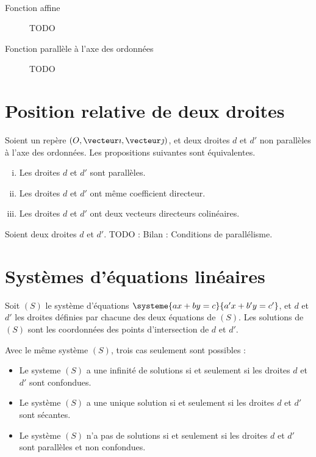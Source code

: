 \begin{methode}~
  \begin{description}
    \item[Fonction affine] TODO
    \item[Fonction parallèle à l'axe des ordonnées] TODO
  \end{description}
\end{methode}

\section{Position relative de deux droites}

\begin{propriete}
  Soient un repère $(O, \vecteur\imath, \vecteur\jmath)$, et deux droites $d$
  et $d'$ non parallèles à l'axe des ordonnées. Les propositions suivantes sont
  équivalentes.
  \begin{enumerate}[(i)]
    \item Les droites $d$ et $d'$ sont parallèles.
    \item Les droites $d$ et $d'$ ont même coefficient directeur.
    \item Les droites $d$ et $d'$ ont deux vecteurs directeurs colinéaires.
  \end{enumerate}
\end{propriete}

\begin{propriete}
  Soient deux droites $d$ et $d'$.
  TODO : Bilan : Conditions de parallélisme.
\end{propriete}

\section{Systèmes d'équations linéaires}

\begin{propriete}
  Soit $(S)$ le système d'équations $\systeme{ax+by=c}{a'x+b'y=c'}$, et $d$ et $d'$ les droites définies par chacune des deux équations de $(S)$. Les solutions de $(S)$ sont les coordonnées des points d'intersection de $d$ et $d'$.
\end{propriete}

\begin{corollaire}Avec le même système $(S)$, trois cas seulement sont possibles :
  \begin{itemize}
    \item Le systeme $(S)$ a une infinité de solutions si et seulement si les droites $d$ et $d'$ sont confondues.
    \item Le système $(S)$ a une unique solution si et seulement si les droites $d$ et $d'$ sont sécantes.
    \item Le système $(S)$ n'a pas de solutions si et seulement si les droites $d$ et $d'$ sont parallèles et non confondues.
  \end{itemize}
\end{corollaire}
